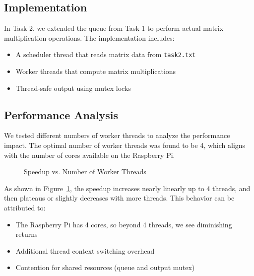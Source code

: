 \documentclass[11pt,a4paper]{article}
\begin{document}
\subsection{Implementation}
In Task 2, we extended the queue from Task 1 to perform actual matrix multiplication operations. The implementation includes:

\begin{itemize}
    \item A scheduler thread that reads matrix data from \texttt{task2.txt}
    \item Worker threads that compute matrix multiplications
    \item Thread-safe output using mutex locks
\end{itemize}

\subsection{Performance Analysis}
We tested different numbers of worker threads to analyze the performance impact. The optimal number of worker threads was found to be 4, which aligns with the number of cores available on the Raspberry Pi.

\begin{figure}[!htb]
\centering
{}
\caption{Speedup vs. Number of Worker Threads}
\label{fig:speedup}
\end{figure}

As shown in Figure~\ref{fig:speedup}, the speedup increases nearly linearly up to 4 threads, and then plateaus or slightly decreases with more threads. This behavior can be attributed to:

\begin{itemize}
    \item The Raspberry Pi has 4 cores, so beyond 4 threads, we see diminishing returns
    \item Additional thread context switching overhead
    \item Contention for shared resources (queue and output mutex)
\end{itemize}
\end{document}
